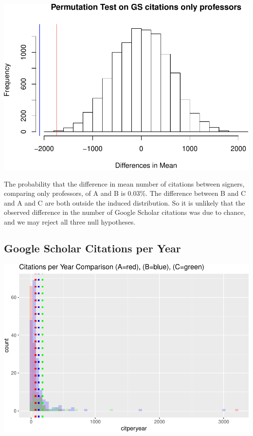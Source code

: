 \documentclass[]{article}
\begin{document}
\includegraphics{final_files/figure-latex/unnamed-chunk-61-1.pdf}

The probability that the difference in mean number of citations between
signers, comparing only professors, of A and B is 0.03\%. The difference
between B and C and A and C are both outside the induced distribution.
So it is unlikely that the observed difference in the number of Google
Scholar citations was due to chance, and we may reject all three null
hypotheses.

\hypertarget{google-scholar-citations-per-year}{%
\subsection{Google Scholar Citations per
Year}\label{google-scholar-citations-per-year}}

\includegraphics{final_files/figure-latex/unnamed-chunk-63-1.pdf}
\end{document}
